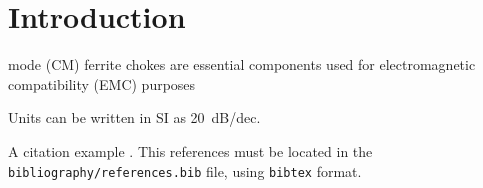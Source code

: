 \section{Introduction}\label{sec:introduction}
 mode (CM) ferrite chokes are essential components used for electromagnetic compatibility (EMC) purposes 

Units can be written in SI as \SI{+20}{dB/dec}.

A citation example \cite{Lee2021,Barba2020,Kacki2023}. 
This references must be located in the \texttt{bibliography/references.bib} file, using \texttt{bibtex} format.